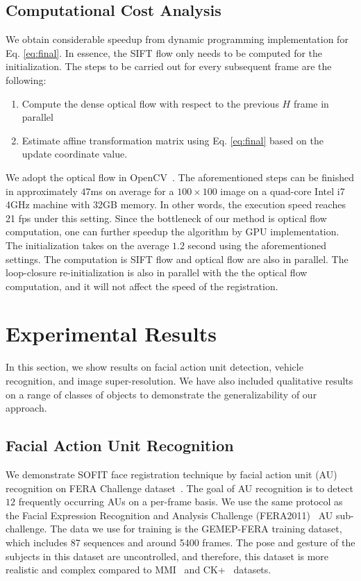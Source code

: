 \documentclass[10pt,journal]{IEEEtran}
\begin{document}
\subsection{\label{sec:time}Computational Cost Analysis}
We obtain considerable speedup from dynamic programming implementation for Eq. \ref{eq:final}. In essence, the SIFT flow only needs to be computed for the initialization. The steps to be carried out for every subsequent frame are the following:
\begin{enumerate}
\item Compute the dense optical flow with respect to the previous $H$ frame in parallel
\item Estimate affine transformation matrix using Eq. \ref{eq:final} based on the update coordinate value.
\end{enumerate}

We adopt the optical flow in OpenCV~\cite{opencv}. The aforementioned steps can be finished in approximately $47$ms on average for a $100\times100$ image on a quad-core Intel i7 4GHz machine with 32GB memory. In other words, the execution speed reaches 21 fps under this setting. Since the bottleneck of our method is optical flow computation, one can further speedup the algorithm by GPU implementation. The initialization takes on the average $1.2$ second using the aforementioned settings. The computation is SIFT flow and optical flow are also in parallel. The loop-closure re-initialization is also in parallel with the the optical flow computation, and it will not affect the speed of the registration. 


\section{\label{sec:experiment}Experimental Results}

In this section, we show results on facial action unit detection, vehicle recognition, and image super-resolution. We have also included qualitative results on a range of classes of objects to demonstrate the generalizability of our approach.

\subsection{Facial Action Unit Recognition}

We demonstrate SOFIT face registration technique by facial action unit (AU) recognition on FERA Challenge dataset~\cite{FERA11}. The goal of AU recognition is to detect $12$ frequently occurring AUs on a per-frame basis. We use the same protocol as the Facial Expression Recognition and Analysis Challenge (FERA2011)~\cite{Valstar_FERA11} AU sub-challenge. The data we use for training is the GEMEP-FERA training dataset, which includes 87 sequences and around 5400 frames. The pose and gesture of the subjects in this dataset are uncontrolled, and therefore, this dataset is more realistic and complex compared to MMI~\cite{Pantic_ICME05} and CK+~\cite{Kanade_FG00} datasets.
\end{document}
